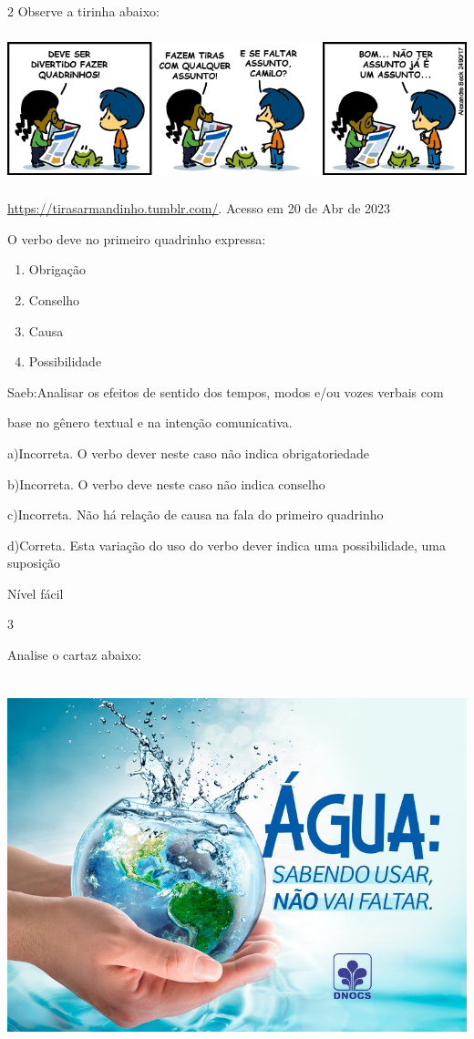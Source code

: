 {\num{2}
Observe a tirinha abaixo:

\includegraphics[width=5.90551in,height=1.70833in]{./imgSAEB_7_POR/media/image12.png}

\href{https://tirasarmandinho.tumblr.com/}{\uline{https://tirasarmandinho.tumblr.com/}}.
Acesso em 20 de Abr de 2023

O verbo deve no primeiro quadrinho expressa:

\begin{enumerate}
\def\labelenumi{\alph{enumi})}
\item
  Obrigação
\item
  Conselho
\item
  Causa
\item
  Possibilidade
\end{enumerate}

Saeb:Analisar os efeitos de sentido dos tempos, modos e/ou vozes verbais
com

base no gênero textual e na intenção comunicativa.

a)Incorreta. O verbo dever neste caso não indica obrigatoriedade

b)Incorreta. O verbo deve neste caso não indica conselho

c)Incorreta. Não há relação de causa na fala do primeiro quadrinho

d)Correta. Esta variação do uso do verbo dever indica uma possibilidade,
uma suposição

Nível fácil

\num{3}

Analise o cartaz abaixo:

\includegraphics[width=5.90551in,height=4.29167in]{./imgSAEB_7_POR/media/image13.png}

}
